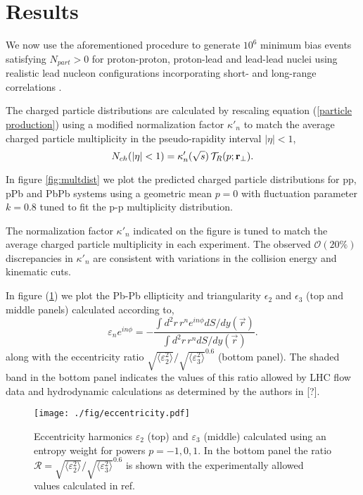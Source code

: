 \documentclass[aps,prl,reprint,amsmath,nofootinbib]{revtex4-1}
\begin{document}
\section{Results}

We now use the aforementioned procedure to generate $10^6$ minimum bias events satisfying $N_{part} > 0$ for proton-proton, proton-lead and lead-lead nuclei using 
realistic lead nucleon configurations incorporating short- and long-range correlations \cite{nucleon-correlations}. 

The charged particle distributions are calculated by rescaling equation (\ref{particle production}) using a modified normalization factor $\kappa'_n$ to match the average charged particle 
multiplicity in the pseudo-rapidity interval $|\eta| < 1$,
\begin{equation}
 N_{ch}(|\eta|<1) = \kappa'_n(\sqrt{s})\, \mathcal{T}_R(p;{\bf r}_\perp).
\end{equation}

In figure \ref{fig:multdist} we plot the predicted charged particle distributions for pp, pPb and PbPb systems using a geometric mean $p=0$ with fluctuation parameter $k=0.8$ tuned 
to fit the p-p multiplicity distribution. 

The normalization factor $\kappa'_n$ indicated on the figure is tuned to match the average charged particle multiplicity in each experiment. The observed
$\mathcal{O}(20\%)$ discrepancies in $\kappa'_n$ are consistent with variations in the collision energy and kinematic cuts.

In figure (\ref{fig:eccen}) we plot the Pb-Pb ellipticity and triangularity $\epsilon_2$ and $\epsilon_3$ (top and middle panels) calculated according to,
\begin{equation}
 \varepsilon_n e^{i n\phi} = -\frac{\int d^2r\, r^n e^{i n \phi} dS/dy(\vec{r})}{\int d^2r\, r^n dS/dy(\vec{r})}.
\end{equation}
along with the eccentricity ratio $\sqrt{\langle \varepsilon_2^2 \rangle}/\sqrt{\langle \varepsilon_3^2 \rangle}^{0.6}$ (bottom panel). The shaded band in the bottom 
panel indicates the values of this ratio allowed by LHC flow data and hydrodynamic calculations as determined by the authors in [?].

\begin{figure}[t]
 \texttt{[image: ./fig/eccentricity.pdf]}
  \caption{\label{fig:eccen} Eccentricity harmonics $\varepsilon_2$ (top) and $\varepsilon_3$ (middle) calculated using an entropy weight for powers $p=-1,0,1$. 
  In the bottom panel the ratio $\mathcal{R} = \sqrt{\langle \varepsilon_2^2 \rangle}/\sqrt{\langle \varepsilon_3^2 \rangle}^{0.6}$ is shown with the experimentally allowed values calculated in ref. \cite{constraining-ic}}
\end{figure}
\end{document}
